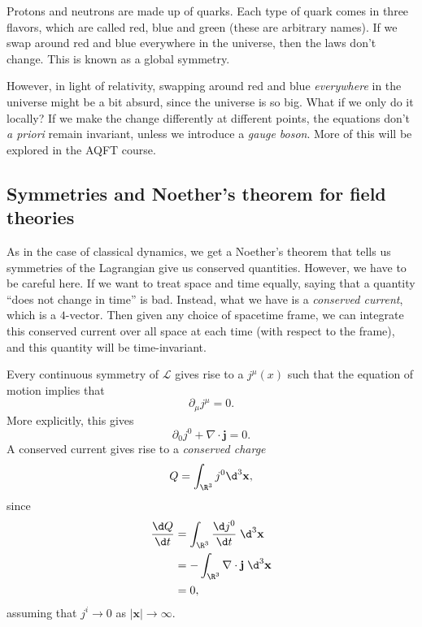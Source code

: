 \documentclass[a4paper]{article}
\begin{document}
\begin{eg}
  Protons and neutrons are made up of quarks. Each type of quark comes in three flavors, which are called red, blue and green (these are arbitrary names). If we swap around red and blue everywhere in the universe, then the laws don't change. This is known as a global symmetry.

  However, in light of relativity, swapping around red and blue \emph{everywhere} in the universe might be a bit absurd, since the universe is so big. What if we only do it locally? If we make the change differently at different points, the equations don't \emph{a priori} remain invariant, unless we introduce a \emph{gauge boson}. More of this will be explored in the AQFT course.
\end{eg}

\subsection{Symmetries and Noether's theorem for field theories}
As in the case of classical dynamics, we get a Noether's theorem that tells us symmetries of the Lagrangian give us conserved quantities. However, we have to be careful here. If we want to treat space and time equally, saying that a quantity ``does not change in time'' is bad. Instead, what we have is a \emph{conserved current}, which is a $4$-vector. Then given any choice of spacetime frame, we can integrate this conserved current over all space at each time (with respect to the frame), and this quantity will be time-invariant.

\begin{thm}
  Every continuous symmetry of $\mathcal{L}$ gives rise to a  $j^\mu(x)$ such that the equation of motion implies that
  \[
    \partial_\mu j^\mu = 0.
  \]
  More explicitly, this gives
  \[
    \partial_0 j^0 + \nabla \cdot \mathbf{j} = 0.
  \]
  A conserved current gives rise to a \emph{conserved charge}
  \[
    Q = \int_{\R^3} j^0 \d^3 \mathbf{x},
  \]
  since
  \begin{align*}
    \frac{\d Q}{\d t} &= \int_{\R^3} \frac{\d j^0}{\d t} \;\d^3 \mathbf{x}\\
    &= -\int_{\R^3} \nabla \cdot \mathbf{j} \;\d ^3 \mathbf{x}\\
    &= 0,
  \end{align*}
  assuming that $j^i \to 0$ as $|\mathbf{x}| \to \infty$.
\end{thm}
\end{document}
